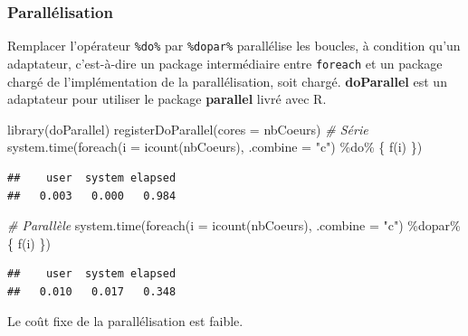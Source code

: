 \documentclass[
  11pt,
  french,
  a4paper,
  extrafontsizes,onecolumn,openright
  ]{memoir}
\newenvironment{Shaded}{\begin{snugshade}}{\end{snugshade}}
\newcommand{\AttributeTok}[1]{\textcolor[rgb]{0.77,0.63,0.00}{#1}}
\newcommand{\CommentTok}[1]{\textcolor[rgb]{0.56,0.35,0.01}{\textit{#1}}}
\newcommand{\FunctionTok}[1]{\textcolor[rgb]{0.00,0.00,0.00}{#1}}
\newcommand{\NormalTok}[1]{#1}
\newcommand{\SpecialCharTok}[1]{\textcolor[rgb]{0.00,0.00,0.00}{#1}}
\newcommand{\StringTok}[1]{\textcolor[rgb]{0.31,0.60,0.02}{#1}}
\begin{document}
\hypertarget{paralluxe9lisation}{%
\subsubsection{Parallélisation}\label{paralluxe9lisation}}

Remplacer l'opérateur \texttt{\%do\%} par \texttt{\%dopar\%} parallélise les boucles, à condition qu'un adaptateur, c'est-à-dire un package intermédiaire entre \texttt{foreach} et un package chargé de l'implémentation de la parallélisation, soit chargé.
\textbf{doParallel} est un adaptateur pour utiliser le package \textbf{parallel} livré avec R.

\scriptsize

\begin{Shaded}
\begin{Highlighting}[]
\FunctionTok{library}\NormalTok{(doParallel)}
\FunctionTok{registerDoParallel}\NormalTok{(}\AttributeTok{cores =}\NormalTok{ nbCoeurs)}
\CommentTok{\# Série}
\FunctionTok{system.time}\NormalTok{(}\FunctionTok{foreach}\NormalTok{(}\AttributeTok{i =} \FunctionTok{icount}\NormalTok{(nbCoeurs), }\AttributeTok{.combine =} \StringTok{"c"}\NormalTok{) }\SpecialCharTok{\%do\%} 
\NormalTok{    \{}
        \FunctionTok{f}\NormalTok{(i)}
\NormalTok{    \})}
\end{Highlighting}
\end{Shaded}

\begin{verbatim}
##    user  system elapsed 
##   0.003   0.000   0.984
\end{verbatim}

\begin{Shaded}
\begin{Highlighting}[]
\CommentTok{\# Parallèle}
\FunctionTok{system.time}\NormalTok{(}\FunctionTok{foreach}\NormalTok{(}\AttributeTok{i =} \FunctionTok{icount}\NormalTok{(nbCoeurs), }\AttributeTok{.combine =} \StringTok{"c"}\NormalTok{) }\SpecialCharTok{\%dopar\%} 
\NormalTok{    \{}
        \FunctionTok{f}\NormalTok{(i)}
\NormalTok{    \})}
\end{Highlighting}
\end{Shaded}

\begin{verbatim}
##    user  system elapsed 
##   0.010   0.017   0.348
\end{verbatim}

\normalsize

Le coût fixe de la parallélisation est faible.
\end{document}
